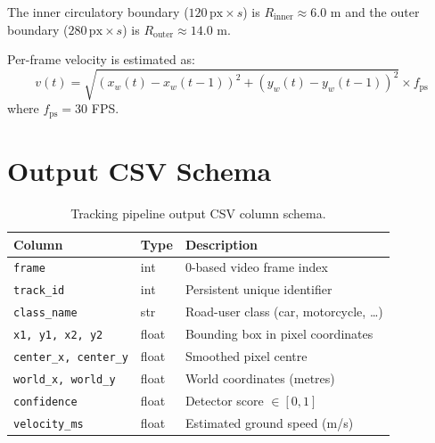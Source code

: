The inner circulatory boundary ($120\,\text{px} \times s$) is $R_{\text{inner}} \approx 6.0$ m
and the outer boundary ($280\,\text{px} \times s$) is $R_{\text{outer}} \approx 14.0$ m.

Per-frame velocity is estimated as:
\begin{equation}
    v(t) = \sqrt{(x_w(t) - x_w(t{-}1))^2 + (y_w(t) - y_w(t{-}1))^2} \times f_{\text{ps}}
    \label{eq:velocity}
\end{equation}
where $f_{\text{ps}} = 30$ FPS.

\section{Output CSV Schema}

\begin{table}[H]
\centering
\caption{Tracking pipeline output CSV column schema.}
\label{tab:csv_schema}
\begin{tabular}{lll}
\toprule
\textbf{Column} & \textbf{Type} & \textbf{Description} \\
\midrule
\texttt{frame}              & int   & 0-based video frame index \\
\texttt{track\_id}          & int   & Persistent unique identifier \\
\texttt{class\_name}        & str   & Road-user class (car, motorcycle, \ldots) \\
\texttt{x1, y1, x2, y2}    & float & Bounding box in pixel coordinates \\
\texttt{center\_x, center\_y} & float & Smoothed pixel centre \\
\texttt{world\_x, world\_y}   & float & World coordinates (metres) \\
\texttt{confidence}         & float & Detector score $\in [0,1]$ \\
\texttt{velocity\_ms}       & float & Estimated ground speed (m/s) \\
\bottomrule
\end{tabular}
\end{table}
